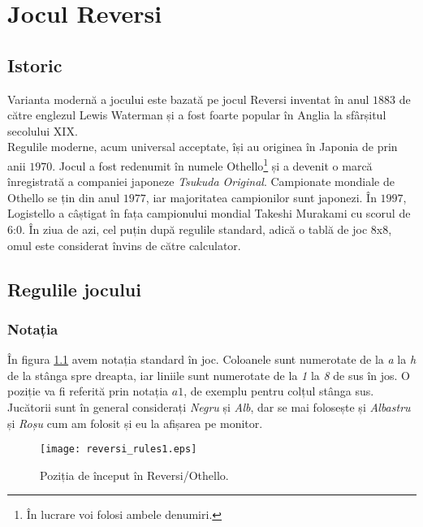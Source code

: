 \documentclass[12pt,twoside,a4paper,fleqn]{book}
\theoremstyle{definition}
\begin{document}
\chapter{Jocul Reversi}
\section{Istoric}
Varianta modernă a jocului este bazată pe jocul Reversi inventat în anul $1883$ de către englezul Lewis Waterman și a fost foarte popular în Anglia la sfârșitul secolului XIX.\\
Regulile moderne, acum universal acceptate, își au originea în Japonia de prin anii $1970$. Jocul a fost redenumit în numele Othello\footnote{În lucrare voi folosi ambele denumiri.} și a devenit o marcă înregistrată a companiei japoneze \emph{Tsukuda Original}. Campionate mondiale de Othello se țin din anul $1977$, iar majoritatea campionilor sunt japonezi. În $1997$, Logistello a câștigat în fața campionului mondial Takeshi Murakami cu scorul de 6:0. În ziua de azi, cel puțin după regulile standard, adică o tablă de joc 8x8, omul este considerat învins de către calculator.

\section{Regulile jocului}
\subsection{Notația}
În figura \ref{fig:rev_rules1} avem notația standard în joc. Coloanele sunt numerotate de la \emph{a} la \emph{h} de la stânga spre dreapta, iar liniile sunt numerotate de la \emph{1} la \emph{8} de sus în jos. O poziție va fi referită prin notația $a1$, de exemplu pentru colțul stânga sus. Jucătorii sunt în general considerați \emph{Negru} și \emph{Alb}, dar se mai folosește și \emph{Albastru} și \emph{Roșu} cum am folosit și eu la afișarea pe monitor.
\begin{figure}[h]
\begin{center}
\texttt{[image: reversi\_rules1.eps]}
\caption{\small{Poziția de început în Reversi/Othello.}}
\label{fig:rev_rules1}
\end{center}
\end{figure}
\end{document}
